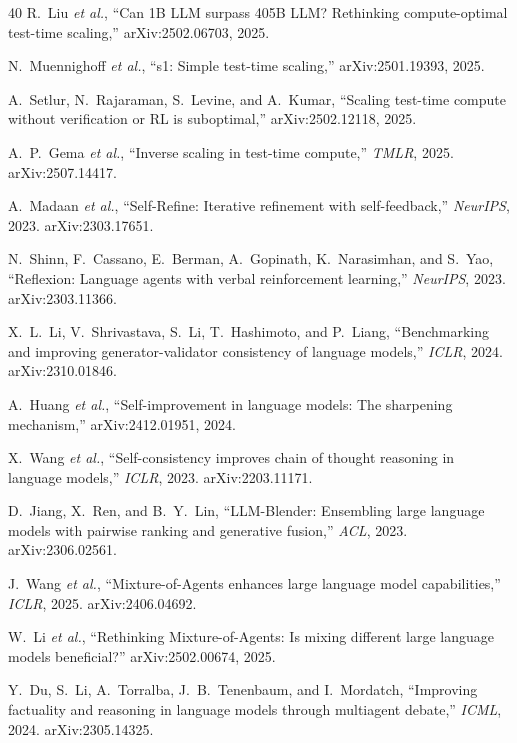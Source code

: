 \documentclass[journal]{IEEEtran}
\begin{document}
\begin{thebibliography}{40}
 R.~Liu \emph{et al.}, ``Can 1B LLM surpass 405B LLM?
Rethinking compute-optimal test-time scaling,'' arXiv:2502.06703, 2025.

 N.~Muennighoff \emph{et al.}, ``s1: Simple test-time
scaling,'' arXiv:2501.19393, 2025.

 A.~Setlur, N.~Rajaraman, S.~Levine, and A.~Kumar,
``Scaling test-time compute without verification or RL is suboptimal,''
arXiv:2502.12118, 2025.

 A.~P.~Gema \emph{et al.}, ``Inverse scaling in test-time
compute,'' \emph{TMLR}, 2025. arXiv:2507.14417.

 A.~Madaan \emph{et al.}, ``Self-Refine: Iterative
refinement with self-feedback,'' \emph{NeurIPS}, 2023. arXiv:2303.17651.

 N.~Shinn, F.~Cassano, E.~Berman, A.~Gopinath,
K.~Narasimhan, and S.~Yao, ``Reflexion: Language agents with verbal
reinforcement learning,'' \emph{NeurIPS}, 2023. arXiv:2303.11366.

 X.~L.~Li, V.~Shrivastava, S.~Li, T.~Hashimoto, and
P.~Liang, ``Benchmarking and improving generator-validator consistency of
language models,'' \emph{ICLR}, 2024. arXiv:2310.01846.

 A.~Huang \emph{et al.}, ``Self-improvement in
language models: The sharpening mechanism,'' arXiv:2412.01951, 2024.

 X.~Wang \emph{et al.}, ``Self-consistency improves chain
of thought reasoning in language models,'' \emph{ICLR}, 2023.
arXiv:2203.11171.

 D.~Jiang, X.~Ren, and B.~Y.~Lin, ``LLM-Blender:
Ensembling large language models with pairwise ranking and generative
fusion,'' \emph{ACL}, 2023. arXiv:2306.02561.

 J.~Wang \emph{et al.}, ``Mixture-of-Agents enhances
large language model capabilities,'' \emph{ICLR}, 2025. arXiv:2406.04692.

 W.~Li \emph{et al.}, ``Rethinking
Mixture-of-Agents: Is mixing different large language models beneficial?''
arXiv:2502.00674, 2025.

 Y.~Du, S.~Li, A.~Torralba, J.~B.~Tenenbaum, and
I.~Mordatch, ``Improving factuality and reasoning in language models through
multiagent debate,'' \emph{ICML}, 2024. arXiv:2305.14325.


\end{thebibliography}
\end{document}
